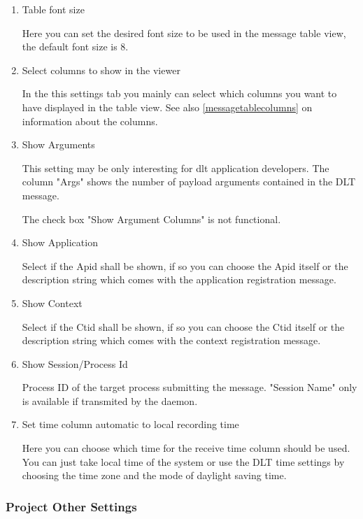 \documentclass[a4paper,11pt]{article}
\begin{document}
\nopagebreak

\begin{enumerate}
\item{Table font size}

Here you can set the desired font size to be used in the message table view, the default font size is 8.

\item{Select columns to show in the viewer}

In the this settings tab you mainly can select which columns you want to have displayed in the table view.
See also \autoref{messagetablecolumns} on information about the columns.

\item{Show Arguments}

This setting may be only interesting for dlt application developers. The column "Args" shows the number of payload arguments contained in the DLT message.

The check box "Show Argument Columns" is not functional.

\item{Show Application}

Select if the Apid shall be shown, if so you can choose the Apid itself or the description string which comes with the application registration message.

\item{Show Context}

Select if the Ctid shall be shown, if so you can choose the Ctid itself or the description string which comes with the context registration message.

\item{Show Session/Process Id}

Process ID of the target process submitting the message. "Session Name" only is available if transmited by the daemon.

\item{Set time column automatic to local recording time}

Here you can choose which time for the receive time column should be used. You can just take local time of the system
or use the DLT time settings by choosing the time zone and the mode of daylight saving time.
\end{enumerate}


\subsubsection{Project Other Settings}
\end{document}

